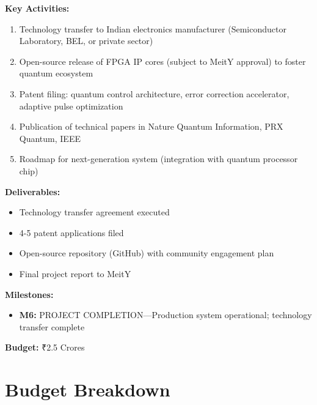 \documentclass[12pt,a4paper]{article}
\begin{document}
\begin{enumerate}[leftmargin=*]
\textbf{Key Activities:}
\begin{enumerate}[leftmargin=*]
    \item Technology transfer to Indian electronics manufacturer (Semiconductor Laboratory, BEL, or private sector)
    \item Open-source release of FPGA IP cores (subject to MeitY approval) to foster quantum ecosystem
    \item Patent filing: quantum control architecture, error correction accelerator, adaptive pulse optimization
    \item Publication of technical papers in Nature Quantum Information, PRX Quantum, IEEE
    \item Roadmap for next-generation system (integration with quantum processor chip)
\end{enumerate}

\textbf{Deliverables:}
\begin{itemize}[leftmargin=*]
    \item Technology transfer agreement executed
    \item 4-5 patent applications filed
    \item Open-source repository (GitHub) with community engagement plan
    \item Final project report to MeitY
\end{itemize}

\textbf{Milestones:}
\begin{itemize}[leftmargin=*]
    \item \textbf{M6:} PROJECT COMPLETION—Production system operational; technology transfer complete
\end{itemize}

\textbf{Budget:} ₹2.5 Crores

\newpage

\section{Budget Breakdown}


\end{enumerate}
\end{document}
